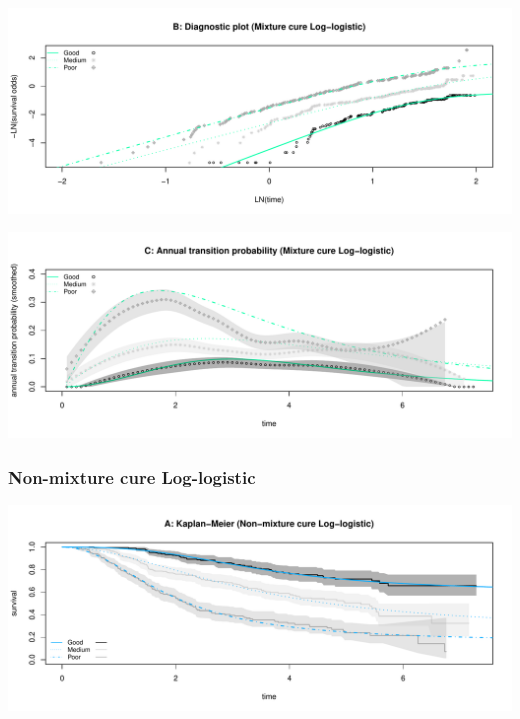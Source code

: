 \documentclass[
]{article}
\begin{document}
\begin{flushleft}\includegraphics[height=0.25\textheight]{BC_OS_output/Images/Figure_cure_models-14} \end{flushleft}

\begin{flushleft}\includegraphics[height=0.25\textheight]{BC_OS_output/Images/Figure_cure_models-15} \end{flushleft}

\clearpage

\subsubsection{Non-mixture cure
Log-logistic}\label{non-mixture-cure-log-logistic}

\begin{flushleft}\includegraphics[height=0.25\textheight]{BC_OS_output/Images/Figure_cure_models-16} \end{flushleft}
\end{document}
